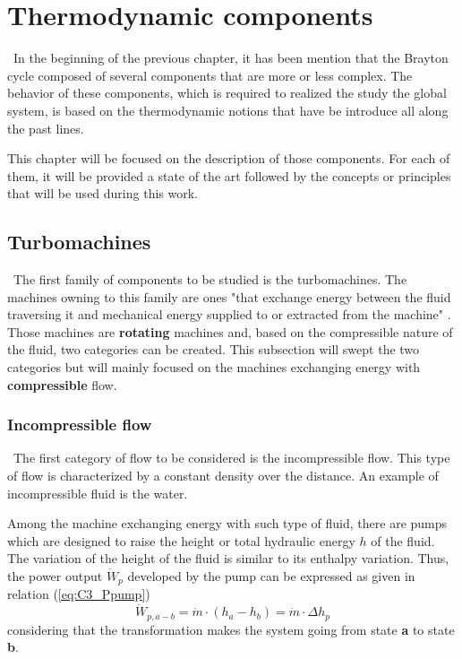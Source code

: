 \graphicspath{{Chapter_3_-_Thermodynamic_components/Images/}}
\chapter{Thermodynamic components}
\quad\, In the beginning of the previous chapter, it has been mention that the Brayton cycle composed of several components that are more or less complex. The behavior of these components, which is required to realized the study the global system, is based on the thermodynamic notions that have be introduce all along the past lines.

This chapter will be focused on the description of those components. For each of them, it will be provided a state of the art followed by the concepts or principles that will be used during this work. 
\section{Turbomachines}
\quad\, The first family of components to be studied is the turbomachines. The machines owning to this family are ones "that exchange energy between the
fluid traversing it and mechanical energy supplied to or extracted from the machine" \cite{Hillewaert2019}. Those machines are \textbf{rotating} machines and, based on the compressible nature of the fluid, two categories can be created.
This subsection will swept the two categories but will mainly focused on the machines exchanging energy with \textbf{compressible} flow.

\subsection{Incompressible flow}
\quad\, The first category of flow to be considered is the incompressible flow. This type of flow is characterized by a constant density over the distance. An example of incompressible fluid is the water.

Among the machine exchanging energy with such type of fluid, there are pumps which are designed to raise the height or total hydraulic energy $h$ of the fluid. The variation of the height of the fluid is similar to its enthalpy variation. Thus, the power output  $\dot{W}_p$ developed by the pump can be expressed as given in relation (\ref{eq:C3_Ppump})
\begin{equation}
\dot{W}_{p,a-b} = \dot{m}\cdot (h_a - h_b)=\dot{m}\cdot\Delta h_p \label{eq:C3_Ppump}
\end{equation}
considering that the transformation makes the system going from state \textbf{a} to state \textbf{b}.


